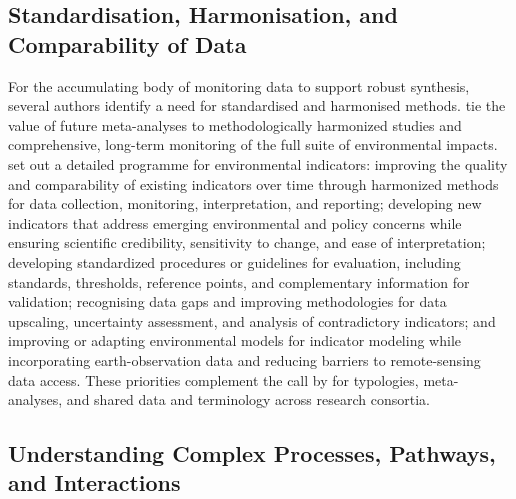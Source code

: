 \subsection{Standardisation, Harmonisation, and Comparability of Data}

For the accumulating body of monitoring data to support robust synthesis, several authors identify a need for standardised and harmonised methods. \textcite{Wu2025} tie the value of future meta-analyses to methodologically harmonized studies and comprehensive, long-term monitoring of the full suite of environmental impacts. \textcite{Zhang2018} set out a detailed programme for environmental indicators: improving the quality and comparability of existing indicators over time through harmonized methods for data collection, monitoring, interpretation, and reporting; developing new indicators that address emerging environmental and policy concerns while ensuring scientific credibility, sensitivity to change, and ease of interpretation; developing standardized procedures or guidelines for evaluation, including standards, thresholds, reference points, and complementary information for validation; recognising data gaps and improving methodologies for data upscaling, uncertainty assessment, and analysis of contradictory indicators; and improving or adapting environmental models for indicator modeling while incorporating earth-observation data and reducing barriers to remote-sensing data access. These priorities complement the call by \textcite{Rogger2017} for typologies, meta-analyses, and shared data and terminology across research consortia.

\subsection{Understanding Complex Processes, Pathways, and Interactions}

